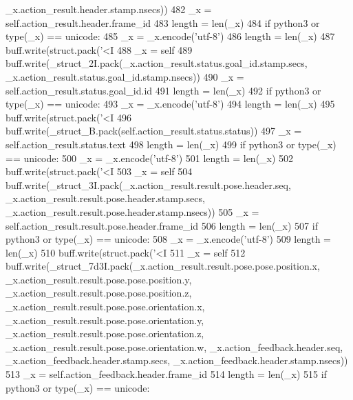 \begin{DoxyCode}
{{{      \_x.action\_result.header.stamp.nsecs))
482       \_x = self.action\_result.header.frame\_id
483       length = len(\_x)
484       \textcolor{keywordflow}{if} python3 \textcolor{keywordflow}{or} type(\_x) == unicode:
485         \_x = \_x.encode(\textcolor{stringliteral}{'utf-8'})
486         length = len(\_x)
487       buff.write(struct.pack(\textcolor{stringliteral}{'<I%
488       \_x = self
489       buff.write(\_struct\_2I.pack(\_x.action\_result.status.goal\_id.stamp.secs, 
      \_x.action\_result.status.goal\_id.stamp.nsecs))
490       \_x = self.action\_result.status.goal\_id.id
491       length = len(\_x)
492       \textcolor{keywordflow}{if} python3 \textcolor{keywordflow}{or} type(\_x) == unicode:
493         \_x = \_x.encode(\textcolor{stringliteral}{'utf-8'})
494         length = len(\_x)
495       buff.write(struct.pack(\textcolor{stringliteral}{'<I%
496       buff.write(\_struct\_B.pack(self.action\_result.status.status))
497       \_x = self.action\_result.status.text
498       length = len(\_x)
499       \textcolor{keywordflow}{if} python3 \textcolor{keywordflow}{or} type(\_x) == unicode:
500         \_x = \_x.encode(\textcolor{stringliteral}{'utf-8'})
501         length = len(\_x)
502       buff.write(struct.pack(\textcolor{stringliteral}{'<I%
503       \_x = self
504       buff.write(\_struct\_3I.pack(\_x.action\_result.result.pose.header.seq, 
      \_x.action\_result.result.pose.header.stamp.secs, \_x.action\_result.result.pose.header.stamp.nsecs))
505       \_x = self.action\_result.result.pose.header.frame\_id
506       length = len(\_x)
507       \textcolor{keywordflow}{if} python3 \textcolor{keywordflow}{or} type(\_x) == unicode:
508         \_x = \_x.encode(\textcolor{stringliteral}{'utf-8'})
509         length = len(\_x)
510       buff.write(struct.pack(\textcolor{stringliteral}{'<I%
511       \_x = self
512       buff.write(\_struct\_7d3I.pack(\_x.action\_result.result.pose.pose.position.x, 
      \_x.action\_result.result.pose.pose.position.y, \_x.action\_result.result.pose.pose.position.z, 
      \_x.action\_result.result.pose.pose.orientation.x, \_x.action\_result.result.pose.pose.orientation.y, \_x.action\_result.result.pose.pose.orientation.z, 
      \_x.action\_result.result.pose.pose.orientation.w, \_x.action\_feedback.header.seq, 
      \_x.action\_feedback.header.stamp.secs, \_x.action\_feedback.header.stamp.nsecs))
513       \_x = self.action\_feedback.header.frame\_id
514       length = len(\_x)
515       \textcolor{keywordflow}{if} python3 \textcolor{keywordflow}{or} type(\_x) == unicode:
}}}}}}}
\end{DoxyCode}
